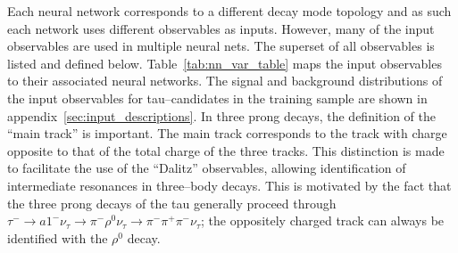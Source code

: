 Each neural network corresponds to a different decay mode topology and as such
each network uses different observables as inputs.  However, many of the input
observables are used in multiple neural nets.  The superset of all observables
is listed and defined below. Table~\ref{tab:nn_var_table} maps the input
observables to their associated neural networks.  The signal and background
distributions of the input observables for tau--candidates in the training
sample are shown in appendix~\ref{sec:input_descriptions}.  In three prong
decays, the definition of the ``main track'' is important.  The main track
corresponds to the track with charge opposite to that of the total charge of the
three tracks.  This distinction is made to facilitate the use of the ``Dalitz''
observables, allowing identification of intermediate resonances in three--body
decays.  This is motivated by the fact that the three prong decays of the tau
generally proceed through $\tau^{-} \to a1^{-} \nu_\tau \rightarrow
\pi^{-} \rho^0 \nu_\tau \to \pi^{-} \pi^{+} \pi^{-} \nu_\tau$; the
oppositely charged track can always be identified with the $\rho^0$ decay.



